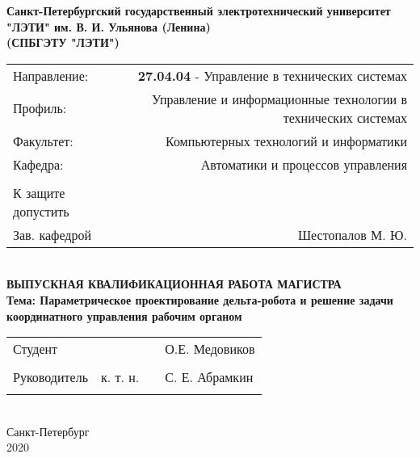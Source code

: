 \begin{center}
\hfill \break
\small{\textbf{Санкт-Петербургский государственный электротехнический университет}}\\
\small{\textbf{"ЛЭТИ" им. В. И. Ульянова (Ленина)}}\\
\small{\textbf{(СПБГЭТУ "ЛЭТИ")}}\\
\hfill \break

\begin{center}
\begin{tabular}{lr}
Направление: & \textbf{27.04.04} - Управление в технических системах \\
Профиль: &  Управление и информационные технологии в технических системах \\
Факультет: & Компьютерных технологий и информатики \\
Кафедра: & Автоматики и процессов управления \\
\\
К защите допустить & \\
Зав. кафедрой &  Шестопалов М. Ю.
\end{tabular}
\end{center}


\normalsize{}\\
 \hfill \break
\hfill\break
\hfill \break
\hfill \break
\hfill \break
\large{\textbf{ВЫПУСКНАЯ КВАЛИФИКАЦИОННАЯ РАБОТА МАГИСТРА}}\\
\hfill \break
\hfill \break
\normalsize{\textbf{Тема: Параметрическое проектирование дельта-робота и решение задачи координатного управления рабочим органом}}\\
\hfill \break
\hfill \break
\hfill \break
\hfill \break
 
\normalsize{ 
	\begin{tabular}{p{150pt} p{}ll}
Студент & & \underline{\hspace{3cm}} & О.Е. Медовиков\\\\
Руководитель & к. т. н. & \underline{\hspace{3cm}} &С. Е. Абрамкин\\\\
\end{tabular}
}\\
\hfill \break
\hfill \break
\hfill \break
\hfill \break
\hfill \break
\hfill \break
Санкт-Петербург \\ 2020 
\end{center}
\thispagestyle{empty} %
 
